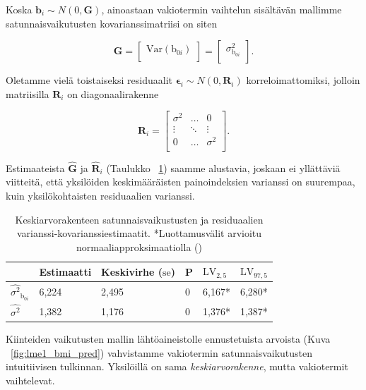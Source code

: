 \documentclass[finnish]{docopts}
\begin{document}
Koska $\bm{b}_i \sim N(0,\bm{G})$, ainoastaan vakiotermin vaihtelun sisältävän mallimme satunnaisvaikutusten kovarianssimatriisi on siten

$$
\bm{G} = 
\begin{bmatrix}
\text{Var}({\text{b}_{0i}})\\
\end{bmatrix} =
\begin{bmatrix}
\sigma^2_{\text{b}_{0i}}\\
\end{bmatrix}.
$$

Oletamme vielä toistaiseksi residuaalit $\bm{\epsilon}_i \sim N(0, \bm{R}_i)$ korreloimattomiksi, jolloin matriisilla $\bm{R}_i$ on diagonaalirakenne

$$
\bm{R}_i =
\begin{bmatrix}
\sigma^2 & \dots & 0 \\
\vdots & \ddots & \vdots \\
0 & \dots & \sigma^2 \\
\end{bmatrix}.
$$

Estimaateista $\hat{\bm{G}}$ ja $\hat{\bm{R}}_i$ (Taulukko ~\ref{table:lme1}) saamme alustavia, joskaan ei yllättäviä viitteitä, että yksilöiden keskimääräisten painoindeksien varianssi on suurempaa, kuin yksilökohtaisten residuaalien varianssi.\\

\begin{table}[H]
\centering
\begin{tabular}{llllll}
\toprule
  & Estimaatti & Keskivirhe ($\text{se}$) & P & $\text{LV}_{2,5}$ & $\text{LV}_{97,5}$\\
\midrule
$\hat{\sigma^2}_{\text{b}_{0i}}$ & 6,224 & 2,495 & 0 & 6,167* & 6,280*\\
\addlinespace
$\hat{\sigma^2}$ & 1,382 & 1,176 & 0 & 1,376* & 1,387*\\
\bottomrule
\end{tabular}
\caption{Keskiarvorakenteen satunnaisvaikustusten ja residuaalien varianssi-kovarianssiestimaatit. *Luottamusvälit arvioitu normaaliapproksimaatiolla (\cite{pinheiro00})}
\label{table:lme1}
\end{table}

Kiinteiden vaikutusten mallin lähtöaineistolle ennustetuista arvoista (Kuva ~\ref{fig:lme1_bmi_pred}) vahvistamme vakiotermin satunnaisvaikutusten intuitiivisen tulkinnan. Yksilöillä on sama \textit{keskiarvorakenne}, mutta vakiotermit vaihtelevat.\\
\end{document}
